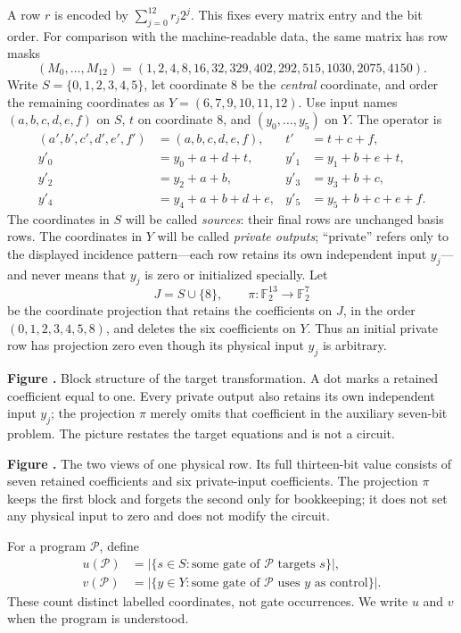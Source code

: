 \documentclass[11pt]{article}
\newcommand{\F}{\mathbb F_2}
\newcommand{\prooffigure}[3]{%
  \begin{center}
  \begin{minipage}{.98\linewidth}
  \centering
  \resizebox{\linewidth}{!}{}\par
  \refstepcounter{figure}\label{#2}%
  \small\textbf{Figure \thefigure.} #3
  \end{minipage}
  \end{center}}
\begin{document}
A row $r$ is encoded by $\sum_{j=0}^{12}r_j2^j$. This fixes every matrix
entry and the bit order. For comparison with the machine-readable data,
the same matrix has row masks
\begin{equation}\label{eq:target}
(M_0,\ldots,M_{12})=(1,2,4,8,16,32,329,402,292,515,1030,2075,4150).
\end{equation}
Write $S=\{0,1,2,3,4,5\}$, let coordinate 8 be the \emph{central}
coordinate, and order the remaining coordinates as
$Y=(6,7,9,10,11,12)$. Use input names $(a,b,c,d,e,f)$ on $S$, $t$ on
coordinate 8, and $(y_0,\ldots,y_5)$ on $Y$. The operator is
\begin{align*}
(a',b',c',d',e',f')&=(a,b,c,d,e,f),& t'&=t+c+f,\\
y'_0&=y_0+a+d+t,&y'_1&=y_1+b+e+t,\\
y'_2&=y_2+a+b,&y'_3&=y_3+b+c,\\
y'_4&=y_4+a+b+d+e,&y'_5&=y_5+b+c+e+f.
\end{align*}
The coordinates in $S$ will be called \emph{sources}: their final rows are
unchanged basis rows. The coordinates in $Y$ will be called \emph{private
outputs}; ``private'' refers only to the displayed incidence pattern---each
row retains its own independent input $y_j$---and never means that $y_j$ is
zero or initialized specially. Let
\[
J=S\cup\{8\},\qquad
\pi:\F^{13}\longrightarrow\F^7
\]
be the coordinate projection that retains the coefficients on $J$, in the
order $(0,1,2,3,4,5,8)$, and deletes the six coefficients on $Y$. Thus an
initial private row has projection zero even though its physical input
$y_j$ is arbitrary.
\prooffigure{target_structure}{fig:target-structure}{Block structure of the
target transformation. A dot marks a retained coefficient equal to one.
Every private output also retains its own independent input $y_j$; the
projection $\pi$ merely omits that coefficient in the auxiliary seven-bit
problem. The picture restates the target equations and is not a circuit.}
\prooffigure{projection_split}{fig:projection-split}{The two views of one
physical row. Its full thirteen-bit value consists of seven retained
coefficients and six private-input coefficients. The projection $\pi$ keeps
the first block and forgets the second only for bookkeeping; it does not set
any physical input to zero and does not modify the circuit.}

For a program $\mathcal P$, define
\[
\begin{aligned}
u(\mathcal P)&=|\{s\in S:\text{some gate of $\mathcal P$ targets $s$}\}|,\\
v(\mathcal P)&=|\{y\in Y:\text{some gate of $\mathcal P$ uses $y$ as control}\}|.
\end{aligned}
\]
These count distinct labelled coordinates, not gate occurrences. We write
$u$ and $v$ when the program is understood.
\end{document}

